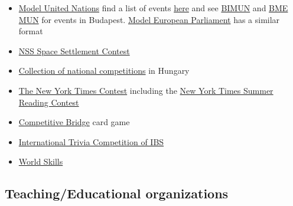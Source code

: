 \documentclass{article}
\begin{document}
\begin{itemize}
    \item \href{https://en.wikipedia.org/wiki/Model_United_Nations}{Model United Nations} find a list of events \href{https://mymun.com/}{here} and see \href{https://www.bimun.hu/}{BIMUN} and \href{https://www.mun.bme.hu/}{BME MUN} for events in Budapest.
    \href{https://mepeurope.eu/}{Model European Parliament} has a similar format
    \item \href{https://isdc2023.nss.org/home/students/settlement/}{NSS Space Settlement Contest}
    \item \href{https://tanulmanyiversenyek.hu/}{Collection of national competitions} in Hungary
    \item \href{https://www.nytimes.com/spotlight/learning-contests}{The New York Times Contest} including the \href{https://www.nytimes.com/2021/04/16/learning/our-12th-annual-summer-reading-contest.html}{New York Times Summer Reading Contest}
    \item \href{http://youth.worldbridge.org/}{Competitive Bridge} card game
    \item \href{https://www.ibs-b.hu/en/win-the-trip-of-your-dreams/}{International Trivia Competition of IBS}
    \item \href{https://worldskills.org/}{World Skills}
\end{itemize}

\subsection{Teaching/Educational organizations}
\end{document}
